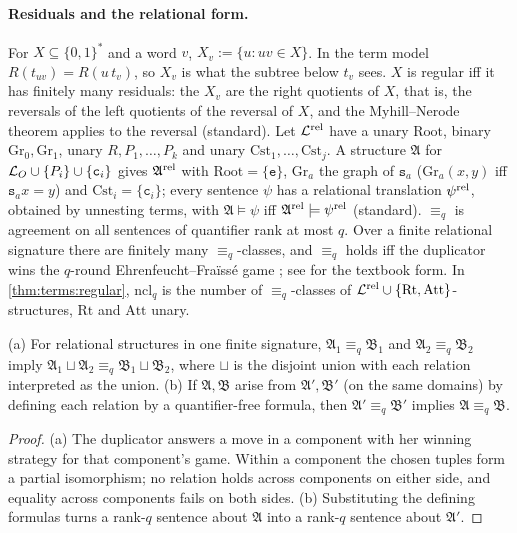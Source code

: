 \paragraph{Residuals and the relational form.} For $X\subseteq\{0,1\}^*$ and a word $v$, $X_v:=\{u:uv\in X\}$. In the term model $R(t_{uv})=R(u\,t_v)$, so $X_v$ is what the subtree below $t_v$ sees. $X$ is regular iff it has finitely many residuals: the $X_v$ are the right quotients of $X$, that is, the reversals of the left quotients of the reversal of $X$, and the Myhill--Nerode theorem applies to the reversal (standard). Let $\mathcal L^{\rm rel}$ have a unary $\mathrm{Root}$, binary $\mathrm{Gr}_0,\mathrm{Gr}_1$, unary $R,P_1,\dots,P_k$ and unary $\mathrm{Cst}_1,\dots,\mathrm{Cst}_j$. A structure $\mathfrak A$ for $\mathcal{L}_{O}\cup\{P_i\}\cup\{\mathtt c_i\}$ gives $\mathfrak A^{\rm rel}$ with $\mathrm{Root}=\{\mathtt e\}$, $\mathrm{Gr}_a$ the graph of $\mathtt s_a$ ($\mathrm{Gr}_a(x,y)$ iff $\mathtt s_ax=y$) and $\mathrm{Cst}_i=\{\mathtt c_i\}$; every sentence $\psi$ has a relational translation $\psi^{\rm rel}$, obtained by unnesting terms, with $\mathfrak A\models\psi$ iff $\mathfrak A^{\rm rel}\models\psi^{\rm rel}$ (standard). $\equiv_q$ is agreement on all sentences of quantifier rank at most $q$. Over a finite relational signature there are finitely many $\equiv_q$-classes, and $\equiv_q$ holds iff the duplicator wins the $q$-round Ehrenfeucht--Fraïssé game \citep{ehrenfeucht1961application,fraisse1954quelques}; see \citet{ebbinghaus1999finite} for the textbook form. In \cref{thm:terms:regular}, $\mathrm{ncl}_q$ is the number of $\equiv_q$-classes of $\mathcal L^{\rm rel}\cup\{\mathrm{Rt},\mathrm{Att}\}$-structures, $\mathrm{Rt}$ and $\mathrm{Att}$ unary.

\begin{lemma}[Composition]\label{lem:terms:EF}
(a) For relational structures in one finite signature, $\mathfrak A_1\equiv_q\mathfrak B_1$ and $\mathfrak A_2\equiv_q\mathfrak B_2$ imply $\mathfrak A_1\sqcup\mathfrak A_2\equiv_q\mathfrak B_1\sqcup\mathfrak B_2$, where $\sqcup$ is the disjoint union with each relation interpreted as the union. (b) If $\mathfrak A,\mathfrak B$ arise from $\mathfrak A',\mathfrak B'$ (on the same domains) by defining each relation by a quantifier-free formula, then $\mathfrak A'\equiv_q\mathfrak B'$ implies $\mathfrak A\equiv_q\mathfrak B$.
\end{lemma}

\begin{proof}
(a) The duplicator answers a move in a component with her winning strategy for that component's game. Within a component the chosen tuples form a partial isomorphism; no relation holds across components on either side, and equality across components fails on both sides. (b) Substituting the defining formulas turns a rank-$q$ sentence about $\mathfrak A$ into a rank-$q$ sentence about $\mathfrak A'$.
\end{proof}

